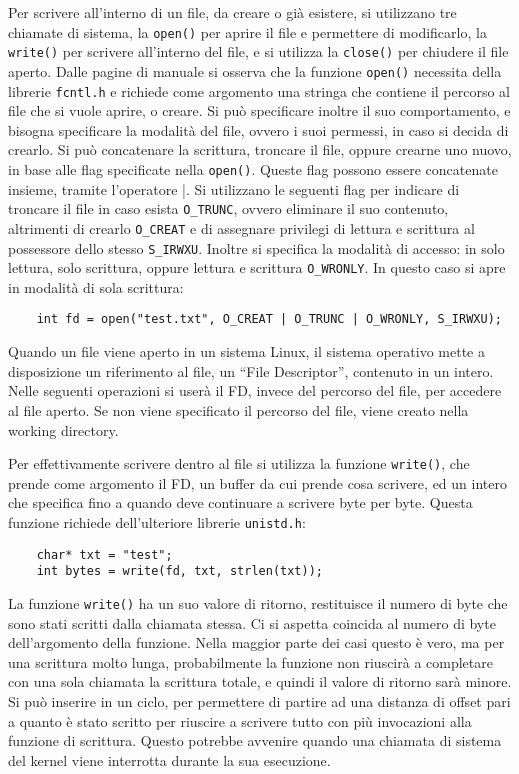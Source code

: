 \documentclass{article}
\numberwithin{equation}{subsection}
\begin{document}
Per scrivere all'interno di un file, da creare o già esistere, si utilizzano tre chiamate di sistema, la \verb|open()| per aprire il file e permettere di 
modificarlo, la \verb|write()| per scrivere all'interno del file, e si utilizza la \verb|close()| per chiudere il file aperto. Dalle pagine di manuale si osserva 
che la funzione \verb|open()| necessita della librerie \verb|fcntl.h| e richiede come argomento una stringa che contiene il percorso al file che si vuole aprire, o 
creare. Si può specificare inoltre il suo comportamento, e bisogna specificare la modalità del file, ovvero i suoi permessi, in caso si decida di crearlo. Si può 
concatenare la scrittura, troncare il file, oppure crearne uno nuovo, in base alle flag specificate nella \verb|open()|. 
Queste flag possono essere concatenate insieme, tramite l'operatore \verb|||. Si utilizzano le seguenti flag per indicare di troncare il file in caso esista \verb|O_TRUNC|, 
ovvero eliminare il suo contenuto, altrimenti 
di crearlo \verb|O_CREAT| e di assegnare privilegi di lettura e scrittura al possessore dello stesso \verb|S_IRWXU|. Inoltre si specifica la modalità di accesso: in solo lettura, solo scrittura, oppure 
lettura e scrittura \verb|O_WRONLY|. In questo caso si apre in modalità di sola scrittura:
\begin{verbatim}
    int fd = open("test.txt", O_CREAT | O_TRUNC | O_WRONLY, S_IRWXU);
\end{verbatim}

Quando un file viene aperto in un sistema Linux, il sistema operativo mette a disposizione un riferimento al file, un ``File Descriptor'', contenuto in un intero. 
Nelle seguenti operazioni si userà il FD, invece del percorso del file, per accedere al file aperto. Se non viene specificato il percorso del file, viene creato 
nella working directory. 

Per effettivamente scrivere dentro al file si utilizza la funzione \verb|write()|, che prende come argomento il FD, un buffer da cui prende cosa scrivere, ed un 
intero che specifica fino a quando deve continuare a scrivere byte per byte. Questa funzione richiede dell'ulteriore librerie \verb|unistd.h|:
\begin{verbatim}
    char* txt = "test";
    int bytes = write(fd, txt, strlen(txt));
\end{verbatim}

La funzione \verb|write()| ha un suo valore di ritorno, restituisce il numero di byte che sono stati scritti dalla chiamata stessa. Ci si aspetta coincida al numero 
di byte dell'argomento della funzione. Nella maggior parte dei casi questo è vero, ma per una scrittura molto lunga, probabilmente la funzione non riuscirà a completare 
con una sola chiamata la scrittura totale, e quindi il valore di ritorno sarà minore. 
Si può inserire in un ciclo, per permettere di partire ad una distanza di offset pari a quanto è stato scritto per riuscire a scrivere tutto con più invocazioni alla 
funzione di scrittura. 
Questo potrebbe avvenire quando una chiamata di sistema del kernel viene interrotta durante la sua esecuzione. 
\end{document}
